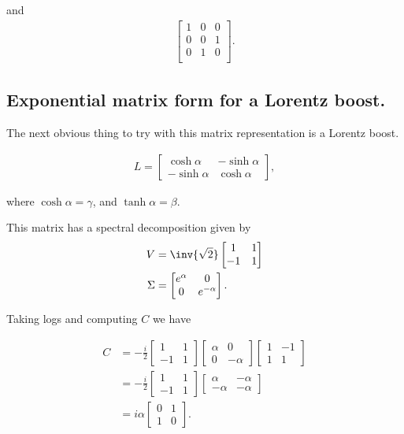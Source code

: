 and
\begin{align*}
\begin{bmatrix}
1 & 0 & 0 \\
0 & 0 & 1 \\
0 & 1 & 0 \\
\end{bmatrix}.
\end{align*}

\subsection{Exponential matrix form for a Lorentz boost.}

The next obvious thing to try with this matrix representation is a Lorentz boost.

\begin{align}\label{eqn:rotationUnitary:40}
L =
\begin{bmatrix}
\cosh\alpha & -\sinh\alpha \\
-\sinh\alpha & \cosh\alpha
\end{bmatrix},
\end{align}

where $\cosh\alpha = \gamma$, and $\tanh\alpha = \beta$.

This matrix has a spectral decomposition given by
\begin{align}\label{eqn:rotationUnitary:41}
V &= \inv{\sqrt{2}}
\begin{bmatrix}
1 & 1 \\
-1 & 1
\end{bmatrix} \\
\Sigma &=
\begin{bmatrix}
e^\alpha & 0 \\
0 & e^{-\alpha}
\end{bmatrix}.
\end{align}

Taking logs and computing $C$ we have

\begin{align*}
C
&=
-\frac{i}{2}
\begin{bmatrix}
1 & 1 \\
-1 & 1 
\end{bmatrix}
\begin{bmatrix}
\alpha & 0 \\
0 & -\alpha
\end{bmatrix} 
\begin{bmatrix}
1 & -1 \\
1 & 1
\end{bmatrix} \\
&=
-\frac{i}{2}
\begin{bmatrix}
1 & 1 \\
-1 & 1 
\end{bmatrix}
\begin{bmatrix}
\alpha & -\alpha \\
-\alpha & -\alpha
\end{bmatrix} \\
&=
i \alpha
\begin{bmatrix}
0 & 1 \\
1 & 0 
\end{bmatrix}.
\end{align*}

